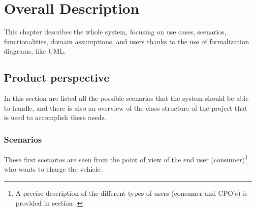 \chapter{Overall Description} \label{description}

This chapter describes the whole system, focusing on use cases, scenarios, functionalities, domain assumptions, and users thanks to the use of formalization diagrams, like UML.

\section{Product perspective}

In this section are listed all the possible scenarios that the system should be able to handle, and there is also an overview of the class structure of the project that is used to accomplish these needs.

\subsection{Scenarios}

These first scenarios are seen from the point of view of the end user (consumer)\footnote{A precise description of the different types of users (consumer and CPO's) is provided in section .} who wants to charge the vehicle.

